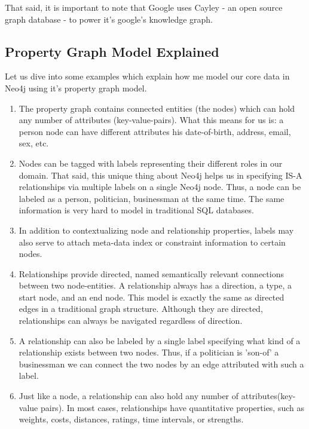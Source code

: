 That said, it is important to note that Google uses Cayley - an open source graph database -  to power it's google's knowledge graph.\cite{cayley} 


\subsection{Property Graph Model Explained}

Let us dive into some examples which explain how me model our core data in Neo4j using it's property graph model.\cite{neogdb}  \\

\begin{enumerate}

\item The property graph contains connected entities (the nodes) which can hold any number of attributes (key-value-pairs). What this means for us is: a person node can have different attributes his date-of-birth, address, email, sex, etc.

\item Nodes can be tagged with labels representing their different roles in our domain. That said, this unique thing about Neo4j helps us in specifying IS-A relationships via multiple labels on a single Neo4j node. Thus, a node can be labeled as a person, politician, businessman at the same time. The same information is very hard to model in traditional SQL databases.

\item In addition to contextualizing node and relationship properties, labels may also serve to attach meta-data index or constraint information to certain nodes.

\item Relationships provide directed, named semantically relevant connections between two node-entities. A relationship always has a direction, a type, a start node, and an end node. This model is exactly the same as directed edges in a traditional graph structure. Although they are directed, relationships can always be navigated regardless of direction.

\item A relationship can also be labeled by a single label specifying what kind of a relationship exists between two nodes. Thus, if a politician is 'son-of' a businessman we can connect the two nodes by an edge attributed with such a label.

\item Just like a node, a relationship can also hold any number of attributes(key-value pairs). In most cases, relationships have quantitative properties, such as weights, costs, distances, ratings, time intervals, or strengths. 


\end{enumerate}
